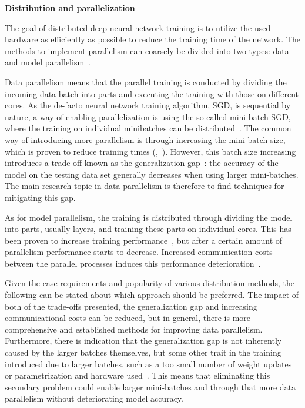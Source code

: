 \textbf{Distribution and parallelization}

The goal of distributed deep neural network training is to utilize the used hardware as efficiently as possible to reduce the training time of the network. The methods to implement parallelism can coarsely be divided into two types: data and model parallelism~\cite{ben-nunDemystifyingParallelDistributed2019}.

Data parallelism means that the parallel training is conducted by dividing the incoming data batch into parts and executing the training with those on different cores. As the de-facto neural network training algorithm, SGD, is sequential by nature, a way of enabling parallelization is using the so-called mini-batch SGD, where the training on individual minibatches can be distributed~\cite{DBLP:conf/icml/LeNCLPN11}. The common way of introducing more parallelism is through increasing the mini-batch size, which is proven to reduce training times (\cite{shallueMeasuringEffectsData2019},~\cite{smithDonDecayLearning2018}). However, this batch size increasing introduces a trade-off known as the generalization gap~\cite{hofferTrainLongerGeneralize2018}: the accuracy of the model on the testing data set generally decreases when using larger mini-batches. The main research topic in data parallelism is therefore to find techniques for mitigating this gap.

As for model parallelism, the training is distributed through dividing the model into parts, usually layers, and training these parts on individual cores. This has been proven to increase training performance~\cite{modelparallel}, but after a certain amount of parallelism performance starts to decrease. Increased communication costs between the parallel processes induces this performance deterioration~\cite{ben-nunDemystifyingParallelDistributed2019}.

Given the case requirements and popularity of various distribution methods, the following can be stated about which approach should be preferred. The impact of both of the trade-offs presented, the generalization gap and increasing communicational costs can be reduced, but in general, there is more comprehensive and established methods for improving data parallelism. Furthermore, there is indication that the generalization gap is not inherently caused by the larger batches themselves, but some other trait in the training introduced due to larger batches, such as a too small number of weight updates~\cite{hofferTrainLongerGeneralize2018} or parametrization and hardware used~\cite{shallueMeasuringEffectsData2019}. This means that eliminating this secondary problem could enable larger mini-batches and through that more data parallelism without deteriorating model accuracy.

